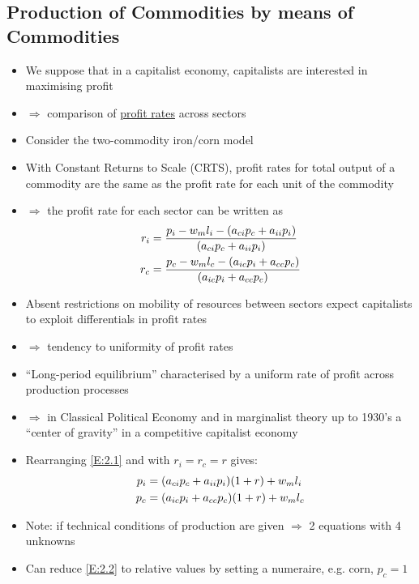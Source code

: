 \documentclass{article}
\begin{document}
\subsection{Production of Commodities by means of Commodities}
	\begin{itemize}
		\item We suppose that in a capitalist economy, capitalists are interested in maximising profit
		\item \( \Rightarrow \) comparison of \underline{profit rates} across sectors
		\item Consider the two-commodity iron/corn model
		\item With Constant Returns to Scale (CRTS), profit rates for total output of a commodity are the same as the profit rate for each unit of the commodity
		\item \( \Rightarrow \) the profit rate for each sector can be written as
		\begin{align}
			r_i &= \frac{p_i - w_m l_i - ( a_{ci} p_c +a_{ii} p_i)}{( a_{ci} p_c +a_{ii} p_i)} \notag \\ 
			r_c &= \frac{p_c - w_m l_c - ( a_{ic} p_i +a_{cc} p_c)}{( a_{ic} p_i +a_{cc} p_c)} \label{E:2.1}
		\end{align} 
		\item Absent restrictions on mobility of resources between sectors expect capitalists to exploit differentials in profit rates
		\item \( \Rightarrow \) tendency to uniformity of profit rates
		\item ``\textcolor{myred}{Long-period equilibrium}'' characterised by a uniform rate of profit across production processes
		\item \( \Rightarrow \) in Classical Political Economy and in marginalist theory up to 1930's a ``center of gravity'' in a competitive capitalist economy
		\item  Rearranging \cref{E:2.1} and with \( r_i = r_c = r \) gives:
		\begin{align}
			p_i &= (a_{ci} p_c + a_{ii} p_i) (1 + r) + w_m l_i \notag \\
			p_c &= (a_{ic} p_i + a_{cc} p_c) (1 + r) + w_m l_c \label{E:2.2}
		\end{align}
		\item Note: if technical conditions of  production are given \( \Rightarrow \) 2 equations with 4 unknowns
		\item Can reduce \cref{E:2.2} to relative values by setting a numeraire, e.g. corn, \( p_c = 1 \)

\end{itemize}
\end{document}
